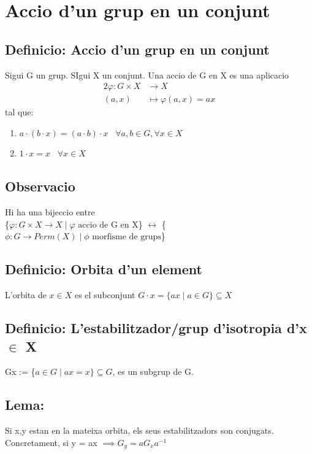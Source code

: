 \documentclass[11pt]{article}
\begin{document}
\section{Accio d'un grup en un conjunt}
\label{sec:org6c96481}
\subsection{Definicio: Accio d'un grup en un conjunt}
\label{sec:orge72d85d}
Sigui G un grup. SIgui X un conjunt. Una accio de G en X es una aplicacio
\begin{alignat*}{2}
\varphi : G \times X &\to X \\
(a, x) &\mapsto \varphi(a,x) = ax
\end{alignat*}
tal que:
\begin{enumerate}
\item \(a \cdot (b \cdot x) = (a \cdot b) \cdot x \hspace{10pt}  \forall a,b \in G, \forall x \in X\)
\item \(1 \cdot x = x \hspace{10pt} \forall x \in X\)
\end{enumerate}
\subsection{Observacio}
\label{sec:org45ea255}
Hi ha una bijeccio entre \\
\{\(\varphi: G \times X \to X \mid \varphi \text{ accio de G en X}\)\} \(\leftrightarrow\) \{\(\phi: G \to Perm(X) \mid \phi \text{ morfisme de grups}\)\}
\subsection{Definicio: Orbita d'un element}
\label{sec:org3354c79}
L'orbita de \(x \in X\) es el subconjunt \(G \cdot x = \{ax \mid a \in G \} \subseteq X\)
\subsection{Definicio: L'estabilitzador/grup d'isotropia d'x \(\in\) X}
\label{sec:org8a079f8}
Gx := \{\(a \in G \mid ax = x \} \subseteq G\), es un subgrup de G.
\subsection{Lema:}
\label{sec:org640ff7e}
Si x,y estan en la mateixa orbita, els seus estabilitzadors son conjugats. \\
Concretament, si y = ax \(\implies G_y = aG_{x}a^{-1}\)
\end{document}
